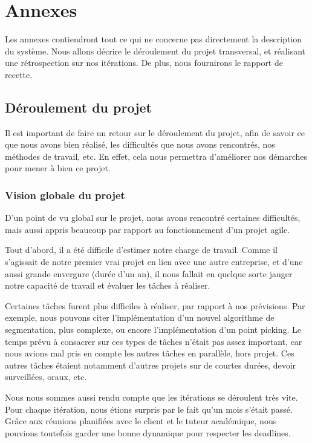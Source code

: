 \documentclass[12pt,titlepage,french]{article}
\begin{document}
\newpage
\section{Annexes}

Les annexes contiendront tout ce qui ne concerne pas directement la description du système. Nous allons décrire le déroulement du projet transversal, et réalisant une rétrospection sur nos itérations. De plus, nous fournirons le rapport de recette.

\subsection{Déroulement du projet}

Il est important de faire un retour sur le déroulement du projet, afin de savoir ce que nous avons bien réalisé, les difficultés que nous avons rencontrés, nos méthodes de travail, etc. En effet, cela nous permettra d'améliorer nos démarches pour mener à bien ce projet.

\subsubsection{Vision globale du projet}

D'un point de vu global sur le projet, nous avons rencontré certaines difficultés, mais aussi appris beaucoup par rapport au fonctionnement d'un projet agile. \newline

Tout d'abord, il a été difficile d'estimer notre charge de travail. Comme il s'agissait de notre premier vrai projet en lien avec une autre entreprise, et d'une aussi grande envergure (durée d'un an), il nous fallait en quelque sorte jauger notre capacité de travail et évaluer les tâches à réaliser. \newline

Certaines tâches furent plus difficiles à réaliser, par rapport à nos prévisions. Par exemple, nous pouvons citer l'implémentation d'un nouvel algorithme de segmentation, plus complexe, ou encore l'implémentation d'un point picking. Le temps prévu à consacrer sur ces types de tâches n'était pas assez important, car nous avions mal pris en compte les autres tâches en parallèle, hors projet. Ces autres tâches étaient notamment d'autres projets sur de courtes durées, devoir surveillées, oraux, etc. \newline

Nous nous sommes aussi rendu compte que les itérations se déroulent très vite. Pour chaque itération, nous étions surpris par le fait qu'un mois s'était passé. Grâce aux réunions planifiées avec le client et le tuteur académique, nous pouvions toutefois garder une bonne dynamique pour respecter les deadlines. \newline
\end{document}
